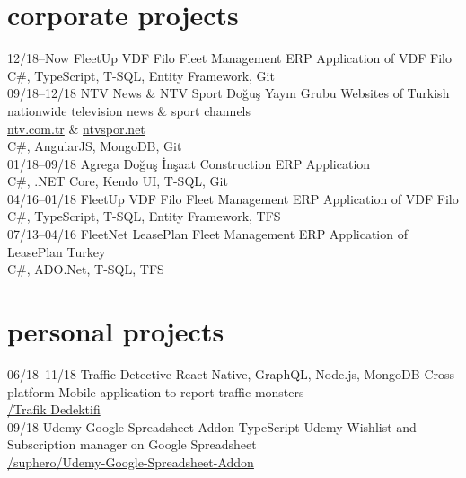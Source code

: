 \documentclass[]{../friggeri-cv} %
\begin{document}
\section{corporate projects}

\begin{entrylist}

\entry
{12/18--Now}
{FleetUp}
{VDF Filo}
{Fleet Management ERP Application of VDF Filo
\\C\#, TypeScript, T-SQL, Entity Framework, Git}
\\
\entry
{09/18--12/18}
{NTV News \& NTV Sport}
{Doğuş Yayın Grubu}
{Websites of Turkish nationwide television news \& sport channels
\\\href{https://www.ntv.com.tr/}{ntv.com.tr} \& \href{http://www.ntvspor.net/}{ntvspor.net}
\\C\#, AngularJS, MongoDB, Git}
\\
\entry
{01/18--09/18}
{Agrega}
{Doğuş İnşaat}
{Construction ERP Application
\\C\#, .NET Core, Kendo UI, T-SQL, Git}
\\
\entry
{04/16--01/18}
{FleetUp}
{VDF Filo}
{Fleet Management ERP Application of VDF Filo
\\C\#, TypeScript, T-SQL, Entity Framework, TFS}
\\
\entry
{07/13--04/16}
{FleetNet}
{LeasePlan}
{Fleet Management ERP Application of LeasePlan Turkey
\\C\#, ADO.Net, T-SQL, TFS}

\end{entrylist}

\section{personal projects}

\begin{entrylist}

\entry
{06/18--11/18}
{Traffic Detective}
{React Native, GraphQL, Node.js, MongoDB}
{Cross-platform Mobile application to report traffic monsters
\\\href{https://play.google.com/store/apps/details?id=com.harunsokullu.trafficdetective}{\faAndroid/Trafik Dedektifi}}
\\
\entry
{09/18}
{Udemy Google Spreadsheet Addon}
{TypeScript}
{Udemy Wishlist and Subscription manager on Google Spreadsheet
\\\href{https://github.com/suphero/Udemy-Google-Spreadsheet-Addon}{\faGithub/suphero/Udemy-Google-Spreadsheet-Addon}}
\end{entrylist}
\end{document}
